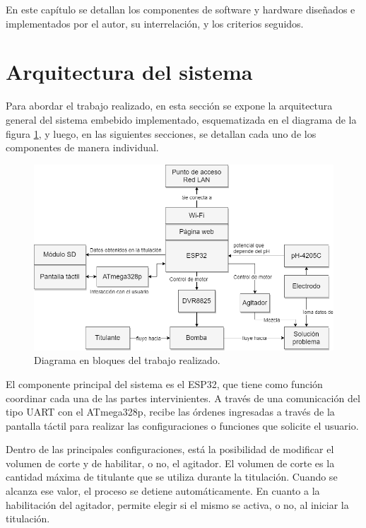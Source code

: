 En este capítulo se detallan los componentes de software y hardware diseñados e implementados por el autor, su interrelación, y los criterios seguidos.

\section{Arquitectura del sistema}

Para abordar el trabajo realizado, en esta sección se expone la arquitectura general del sistema embebido implementado, esquematizada en el diagrama de la figura \ref{fig:diagramaCompleto}, y luego, en las siguientes secciones, se detallan cada uno de los componentes de manera individual.

\begin{figure}[htbp]
	\centering
	\includegraphics[width=1.0\textwidth]{./Figures/DiagramaBloquesCompleto.png}
	\caption{Diagrama en bloques del trabajo realizado.}
	\label{fig:diagramaCompleto}
\end{figure}

El componente principal del sistema es el ESP32, que tiene como función coordinar cada una de las partes intervinientes. A través de una comunicación del tipo UART con el ATmega328p, recibe las órdenes ingresadas a través de la pantalla táctil para realizar las configuraciones o funciones que solicite el usuario.

Dentro de las principales configuraciones, está la posibilidad de modificar el volumen de corte y de habilitar, o no, el agitador. El volumen de corte es la cantidad máxima de titulante que se utiliza durante la titulación. Cuando se alcanza ese valor, el proceso se detiene automáticamente. En cuanto a la habilitación del agitador, permite elegir si el mismo se activa, o no, al iniciar la titulación.

